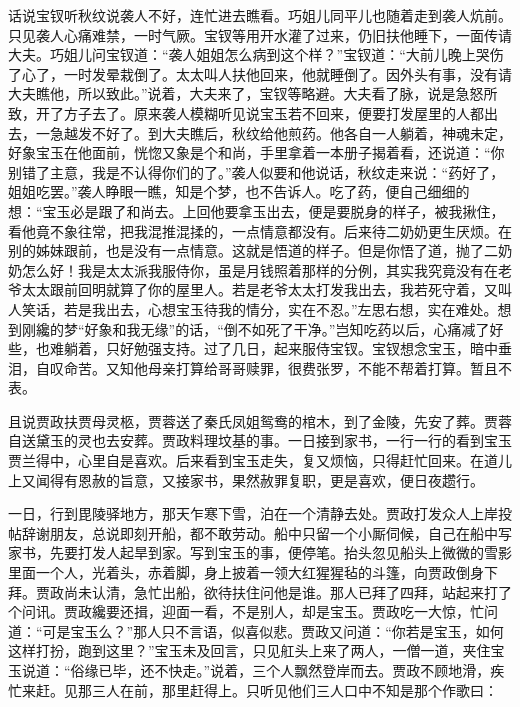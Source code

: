 


\begin{parag}
    话说宝钗听秋纹说袭人不好，连忙进去瞧看。巧姐儿同平儿也随着走到袭人炕前。只见袭人心痛难禁，一时气厥。宝钗等用开水灌了过来，仍旧扶他睡下，一面传请大夫。巧姐儿问宝钗道：“袭人姐姐怎么病到这个样？”宝钗道：“大前儿晚上哭伤了心了，一时发晕栽倒了。太太叫人扶他回来，他就睡倒了。因外头有事，没有请大夫瞧他，所以致此。”说着，大夫来了，宝钗等略避。大夫看了脉，说是急怒所致，开了方子去了。原来袭人模糊听见说宝玉若不回来，便要打发屋里的人都出去，一急越发不好了。到大夫瞧后，秋纹给他煎药。他各自一人躺着，神魂未定，好象宝玉在他面前，恍惚又象是个和尚，手里拿着一本册子揭着看，还说道：“你别错了主意，我是不认得你们的了。”袭人似要和他说话，秋纹走来说：“药好了，姐姐吃罢。”袭人睁眼一瞧，知是个梦，也不告诉人。吃了药，便自己细细的想：“宝玉必是跟了和尚去。上回他要拿玉出去，便是要脱身的样子，被我揪住，看他竟不象往常，把我混推混揉的，一点情意都没有。后来待二奶奶更生厌烦。在别的姊妹跟前，也是没有一点情意。这就是悟道的样子。但是你悟了道，抛了二奶奶怎么好！我是太太派我服侍你，虽是月钱照着那样的分例，其实我究竟没有在老爷太太跟前回明就算了你的屋里人。若是老爷太太打发我出去，我若死守着，又叫人笑话，若是我出去，心想宝玉待我的情分，实在不忍。”左思右想，实在难处。想到刚纔的梦“好象和我无缘”的话，“倒不如死了干净。”岂知吃药以后，心痛减了好些，也难躺着，只好勉强支持。过了几日，起来服侍宝钗。宝钗想念宝玉，暗中垂泪，自叹命苦。又知他母亲打算给哥哥赎罪，很费张罗，不能不帮着打算。暂且不表。
\end{parag}


\begin{parag}
    且说贾政扶贾母灵柩，贾蓉送了秦氏凤姐鸳鸯的棺木，到了金陵，先安了葬。贾蓉自送黛玉的灵也去安葬。贾政料理坟基的事。一日接到家书，一行一行的看到宝玉贾兰得中，心里自是喜欢。后来看到宝玉走失，复又烦恼，只得赶忙回来。在道儿上又闻得有恩赦的旨意，又接家书，果然赦罪复职，更是喜欢，便日夜趱行。
\end{parag}


\begin{parag}
    一日，行到毘陵驿地方，那天乍寒下雪，泊在一个清静去处。贾政打发众人上岸投帖辞谢朋友，总说即刻开船，都不敢劳动。船中只留一个小厮伺候，自己在船中写家书，先要打发人起旱到家。写到宝玉的事，便停笔。抬头忽见船头上微微的雪影里面一个人，光着头，赤着脚，身上披着一领大红猩猩毡的斗篷，向贾政倒身下拜。贾政尚未认清，急忙出船，欲待扶住问他是谁。那人已拜了四拜，站起来打了个问讯。贾政纔要还揖，迎面一看，不是别人，却是宝玉。贾政吃一大惊，忙问道：“可是宝玉么？”那人只不言语，似喜似悲。贾政又问道：“你若是宝玉，如何这样打扮，跑到这里？”宝玉未及回言，只见舡头上来了两人，一僧一道，夹住宝玉说道：“俗缘已毕，还不快走。”说着，三个人飘然登岸而去。贾政不顾地滑，疾忙来赶。见那三人在前，那里赶得上。只听见他们三人口中不知是那个作歌曰：
\end{parag}


